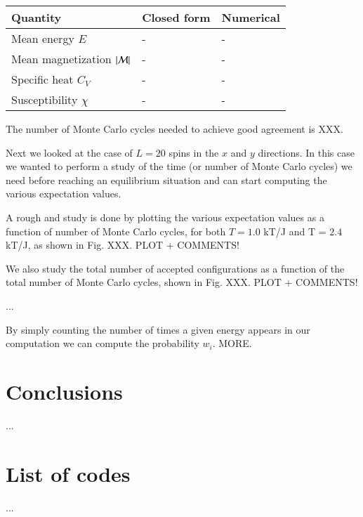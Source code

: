 \documentclass{article}
\begin{document}
\begin{multicols}{2}
\begin{center}
\begin{tabular}{ l l l }\hline
	Quantity 								& Closed form	 				& Numerical		\\ \hline
	Mean energy $E$ 						& - 							& -		 \\
	Mean magnetization $|{\cal M}|$ 			& -							& -		 \\
	Specific heat $C_V$						& -							& - 		\\
	Susceptibility $\chi$						& -							& -		\\
	\hline
\end{tabular}
\end{center}
The number of Monte Carlo cycles needed to achieve good agreement is XXX.

Next we looked at the case of $L = 20$ spins in the $x$ and $y$ directions. In this case we wanted to perform a study of the time (or number of Monte Carlo cycles) we need before reaching an equilibrium situation and can start computing the various expectation values. 

A rough and study is done by plotting the various expectation values as a function of number of Monte Carlo cycles, for both $T = 1.0$ kT/J and T = $2.4$ kT/J, as shown in Fig. XXX. PLOT + COMMENTS!

We also study the total number of accepted configurations as a function of the total number of Monte Carlo cycles, shown in Fig. XXX. PLOT + COMMENTS! 

...

By simply counting the number of times a given energy appears in our computation we can compute the probability $w_i$. MORE. 




\section{Conclusions}

...





\section{List of codes}

...

\end{multicols}
\end{document}
